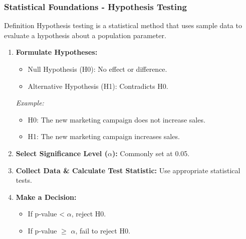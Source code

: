 \documentclass{beamer}
\begin{document}
\begin{frame}[fragile]
    \frametitle{Statistical Foundations - Hypothesis Testing}
    \begin{block}{Definition}
        Hypothesis testing is a statistical method that uses sample data to evaluate a hypothesis about a population parameter.
    \end{block}
    
    \begin{enumerate}
        \item \textbf{Formulate Hypotheses:}
            \begin{itemize}
                \item Null Hypothesis (H0): No effect or difference.
                \item Alternative Hypothesis (H1): Contradicts H0.
            \end{itemize}
            \textit{Example:} 
            \begin{itemize}
                \item H0: The new marketing campaign does not increase sales.
                \item H1: The new marketing campaign increases sales.
            \end{itemize}
            
        \item \textbf{Select Significance Level (\(\alpha\)):} Commonly set at 0.05.

        \item \textbf{Collect Data \& Calculate Test Statistic:} Use appropriate statistical tests.

        \item \textbf{Make a Decision:}
            \begin{itemize}
                \item If p-value < \(\alpha\), reject H0.
                \item If p-value \(\geq\) \(\alpha\), fail to reject H0.
            \end{itemize}
    \end{enumerate}
\end{frame}
\end{document}
